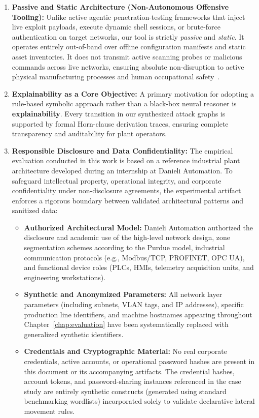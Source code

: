 \documentclass[target=mst,aauheader=aics,style=]{thud}
\begin{document}
\begin{enumerate}
    \item \textbf{Passive and Static Architecture (Non-Autonomous Offensive Tooling):} Unlike active agentic penetration-testing frameworks that inject live exploit payloads, execute dynamic shell sessions, or brute-force authentication on target networks, our tool is strictly \textit{passive} and \textit{static}. It operates entirely out-of-band over offline configuration manifests and static asset inventories. It does not transmit active scanning probes or malicious commands across live networks, ensuring absolute non-disruption to active physical manufacturing processes and human occupational safety~\cite{SunderOT}.
    \item \textbf{Explainability as a Core Objective:} A primary motivation for adopting a rule-based symbolic approach rather than a black-box neural reasoner is \textbf{explainability}. Every transition in our synthesized attack graphs is supported by formal Horn-clause derivation traces, ensuring complete transparency and auditability for plant operators.
    \item \textbf{Responsible Disclosure and Data Confidentiality:} 
The empirical evaluation conducted in this work is based on a reference industrial plant architecture developed during an internship at Danieli Automation. To safeguard intellectual property, operational integrity, and corporate confidentiality under non-disclosure agreements, the experimental artifact enforces a rigorous boundary between validated architectural patterns and sanitized data:

\begin{itemize}
    \item \textbf{Authorized Architectural Model:} Danieli Automation authorized the disclosure and academic use of the high-level network design, zone segmentation schemes according to the Purdue model, industrial communication protocols (e.g., Modbus/TCP, PROFINET, OPC UA), and functional device roles (PLCs, HMIs, telemetry acquisition units, and engineering workstations).
    
    \item \textbf{Synthetic and Anonymized Parameters:} All network layer parameters (including subnets, VLAN tags, and IP addresses), specific production line identifiers, and machine hostnames appearing throughout Chapter~\ref{chap:evaluation} have been systematically replaced with generalized synthetic identifiers. 
    
    \item \textbf{Credentials and Cryptographic Material:} No real corporate credentials, active accounts, or operational password hashes are present in this document or its accompanying artifacts. The credential hashes, account tokens, and password-sharing instances referenced in the case study are entirely synthetic constructs (generated using standard benchmarking wordlists) incorporated solely to validate declarative lateral movement rules.
    

\end{itemize}
\end{enumerate}
\end{document}
